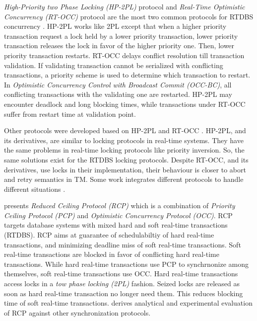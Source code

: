 \documentclass[12pt,english]{report}
\begin{document}
\textit{High-Priority two Phase Locking (HP-2PL)} protocol \cite{lam1997concurrency,259432,5532682,1541104}
and \textit{Real-Time Optimistic Concurrency (RT-OCC)} protocol \cite{lam1997concurrency,1401009,859541,259432,1541104,495222}
are the most two common protocols for RTDBS concurrency . HP-2PL works
like 2PL except that when a higher priority transaction request a
lock held by a lower priority transaction, lower priority transaction
releases the lock in favor of the higher priority one. Then, lower
priority transaction restarts. RT-OCC delays conflict resolution till
transaction validation. If validating transaction cannot be serialized
with conflicting transactions, a priority scheme is used to determine
which transaction to restart. In \textit{Optimistic Concurrency Control
with Broadcast Commit (OCC-BC)}, all conflicting transactions with
the validating one are restarted. HP-2PL may encounter deadlock and
long blocking times, while transactions under RT-OCC suffer from restart
time at validation point.

Other protocols were developed based on HP-2PL \cite{lam1997concurrency,5532682,1541104}
and RT-OCC \cite{lam1997concurrency,1401009,4680843,495222}. HP-2PL,
and its derivatives, are similar to locking protocols in real-time
systems. They have the same problems in real-time locking protocols
like priority inversion. So, the same solutions exist for the RTDBS
locking protocols. Despite RT-OCC, and its derivatives, use locks
in their implementation, their behaviour is closer to abort and retry
semantics in TM. Some work integrates different protocols to handle
different situations \cite{853991,5532682}.

\cite{lam1997concurrency} presents \textit{Reduced Ceiling Protocol
(RCP)} which is a combination of \textit{Priority Ceiling Protocol
(PCP)} and \textit{Optimistic Concurrency Protocol (OCC)}. RCP targets
database systems with mixed hard and soft real-time transactions (RTDBS).
RCP aims at guarantee of schedulabiltiy of hard real-time transactions,
and minimizing deadline miss of soft real-time transactions. Soft
real-time transactions are blocked in favor of conflicting hard real-time
transactions. While hard real-time transactions use PCP to synchrnonize
among themselves, soft real-time transactions use OCC. Hard real-time
transactions access locks in a \textit{tow phase locking (2PL)} fashion.
Seized locks are released as soon as hard real-time transaction no
longer need them. This reduces blocking time of soft real-time transactions.
\cite{lam1997concurrency} derives analytical and experimental evaluation
of RCP against other synchronization protocols.
\end{document}
